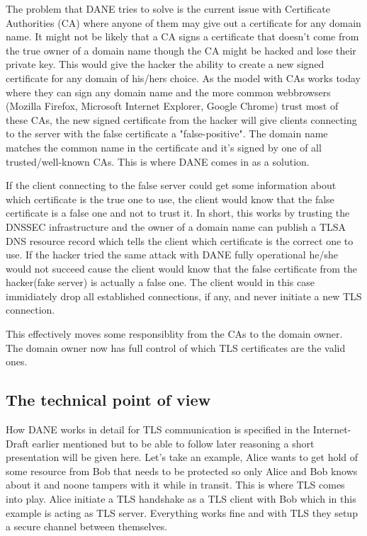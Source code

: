 The problem that DANE tries to solve is the current issue with Certificate Authorities (CA) where anyone of them may give out a certificate for any domain name.
It might not be likely that a CA signs a certificate that doesn't come from the true owner of a domain name though the CA might be hacked and lose their private key. 
This would give the hacker the ability to create a new signed certificate for any domain of his/hers choice.
As the model with CAs works today where they can sign any domain name and the more common webbrowsers (Mozilla Firefox, Microsoft Internet Explorer, Google Chrome) trust most of these CAs, the new signed certificate from the hacker will give clients connecting to the server with the false certificate a "false-positive".
The domain name matches the common name in the certificate and it's signed by one of all trusted/well-known CAs.
This is where DANE comes in as a solution.

If the client connecting to the false server could get some information about which certificate is the true one to use, the client would know that the false certificate is a false one and not to trust it.
In short, this works by trusting the DNSSEC infrastructure and the owner of a domain name can publish a TLSA DNS resource record which tells the client which certificate is the correct one to use.
If the hacker tried the same attack with DANE fully operational he/she would not succeed cause the client would know that the false certificate from the hacker(fake server) is actually a false one.
The client would in this case immidiately drop all established connections, if any, and never initiate a new TLS connection.

This effectively moves some responsiblity from the CAs to the domain owner.
The domain owner now has full control of which TLS certificates are the valid ones.

\subsection{The technical point of view}
How DANE works in detail for TLS communication is specified in the Internet-Draft earlier mentioned\cite{rfc:draft-dane} but to be able to follow later reasoning a short presentation will be given here.
Let's take an example, Alice wants to get hold of some resource from Bob that needs to be protected so only Alice and Bob knows about it and noone tampers with it while in transit.
This is where TLS comes into play.
Alice initiate a TLS handshake as a TLS client with Bob which in this example is acting as TLS server. 
Everything works fine and with TLS they setup a secure channel between themselves.

